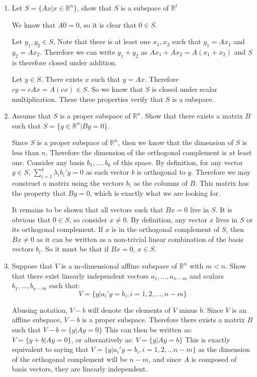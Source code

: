 \documentclass[12pt]{paper}
\newcommand{\setR}{ \mathbb{R} }
\begin{document}
\begin{enumerate}
\item Let $S = \{ Ax \vert x \in \setR^n \}$, show that $S$ is a subspace of
  $\setR^l$

  We know that $A0 = 0$, so it is clear that $0 \in S$.
  
  Let $y_1,y_2 \in S$, Note that there is at least one $x_1,x_2$ such
  that $y_1 = Ax_1$ and $y_2 = Ax_2$. Therefore we can write $y_1 +
  y_2$ as $Ax_1 + Ax_2 = A(x_1 + x_2)$ and $S$ is therefore closed
  under addition.

  Let $y \in S$. There exists $x$ such that $y = Ax$. Therefore $cy =
  cAx = A(cx) \in S$. So we know that $S$ is closed under scalar
  multiplication. These three properties verify that $S$ is a
  subspace.
\item Assume that $S$ is a proper subspace of $\setR^n$. Show that
  there exists a matrix $B$ such that $S = \{ y \in \setR^n \vert By = 0
  \}$.


  Since $S$ is a proper subspace of $\setR^n$, then we know that the
  dimension of $S$ is less than $n$. Therefore the dimension of the
  orthogonal complement is at least one. Consider any basis
  $b_1,...,b_k$ of this space. By definition, for any vector $y \in S$,
  $\sum_{i=1}^k \lambda_i b_i' y = 0$ as each vector $b$ is orthogonal to
  $y$. Therefore we may construct a matrix using the vectors $b_i$ as
  the columns of $B$. This matrix has the property that $By = 0$,
  which is exactly what we are looking for.

  It remains to be shown that all vectors such that $Bx = 0$ live in
  $S$. It is obvious that $0 \in S$, so consider $x \neq 0$. By definition,
  any vector $x$ lives in $S$ or its orthogonal complement. If $x$ is
  in the orthogonal complement of $S$, then $Bx \neq 0$ as it can be
  written as a non-trivial linear combination of the basis vectors
  $b_i$. So it must be that if $Bx = 0$, $x \in S$.
\item Suppose that $V$ is a m-dimensional affline subspace of
  $\setR^n$ with $m < n$. Show that there exist linearly independent
  vectors $a_1, ..., a_{n-m}$ and scalars $b_1, ..., b_{n-m}$ such
  that:
  \begin{equation*}
    V = \{y \vert a_i' y = b_i, i= 1,2,...,n-m \}
  \end{equation*}

  Abusing notation, $V-b$ will denote the elements of $V$ minus
  $b$. Since $V$ is an affline subspace, $V-b$ is a proper
  subspace. Therefore there exists a matrix $B$ such that $V-b = \{ y
  \vert Ay = 0 \}$ This can then be written as: $V = \{ y + b \vert Ay = 0
  \}$, or alternatively as: $V = \{ y \vert Ay = b \}$ This is exactly
  equivalent to saying that $V = \{ y \vert a_i'y = b_i, i = 1,2,...n-m
  \}$ as the dimension of the orthogonal complement will be $n-m$, and
  since $A$ is composed of basis vectors, they are linearly
  independent. 
\end{enumerate}
\end{document}
